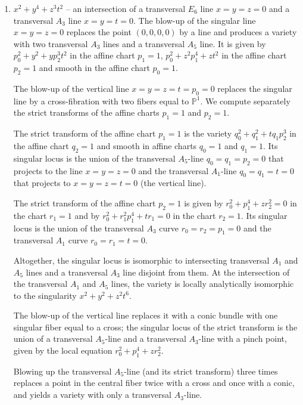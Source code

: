 \documentclass[a4paper]{amsart}
\theoremstyle{plain}
\theoremstyle{definition}
\theoremstyle{remark}
\numberwithin{equation}{section}
\begin{document}
\begin{enumerate}[itemsep=2mm plus 2mm]
\item $x^2 + y^4 + z^3 t^2$ -- an intersection of a transversal $E_{6}$ line $x=y=z=0$ and a transversal $A_{3}$ line $x=y=t=0$. The blow-up of the singular line $x=y=z=0$ replaces the point $(0,0,0,0)$ by
a line and produces a variety with two transversal $A_{3}$ lines and a transversal $A_{5}$ line. It is given by
$p_{0}^{2}+y^{2}+yp_{2}^{3}t^{2}$
in the affine chart $p_{1}=1$, $p_{0}^{2}+z^{2}p_{1}^{4}+zt^{2}$ in the affine chart $p_{2}=1$ and smooth in the affine chart $p_{0}=1$.

The blow-up of the vertical line $x=y=z=t=p_{0}=0$ replaces the singular line by a cross-fibration with two fibers equal to $\mathbb P^{1}$.
We compute separately the strict transforms of the affine charts $p_{1}=1$ and $p_{2}=1$.

The strict transform of the affine chart $p_{1}=1$ is the variety $q_{0}^{2}+q_{1}^{2}+tq_{1}p_{2}^{3}$ in the affine chart $q_{2}=1$ and smooth in affine charts $q_{0}=1$ and $q_{1}=1$.
Its singular locus is the union of the transversal $A_{5}$-line $q_{0}=q_{1}=p_{2}=0$ that projects to the line $x=y=z=0$ and the transversal $A_{1}$-line $q_{0}=q_{1}=t=0$ that projects to $x=y=z=t=0$ (the vertical line).

The strict transform of the affine chart $p_{2}=1$ is given by
$r_{0}^{2}+p_{1}^{4}+zr_{2}^{2}=0$ in the chart $r_{1}=1$ and by
$r_{0}^{2}+r_{1}^{2}p_{1}^{4}+tr_{1}=0$ in the chart $r_{2}=1$.
Its singular locus is the union of the transversal $A_{3}$ curve
$r_{0}=r_{2}=p_{1}=0$ and the transversal $A_{1}$ curve
$r_{0}=r_{1}=t=0$.

Altogether, the singular locus is isomorphic to intersecting transversal $A_{1}$ and $A_{5}$ lines and a transversal $A_{3}$ line disjoint from them. At the intersection of the transversal $A_{1}$ and $A_{5}$ lines, the variety is locally analytically isomorphic to the singularity $x^{2}+y^{2}+z^{2}t^{6}$.

The blow-up of the vertical line replaces it with a conic bundle with one singular fiber equal to a cross; the singular locus of the strict transform is the union of a transversal $A_{5}$-line and a transversal $A_{3}$-line with a pinch point, given by the local equation $r_{0}^{2}+p_{1}^{4}+zr_{2}^{2}$.

Blowing up the transversal $A_{5}$-line (and its strict transform) three times replaces a point in the central fiber twice with a cross and once with a conic, and yields a variety with only a transversal $A_{3}$-line.


\end{enumerate}
\end{document}
